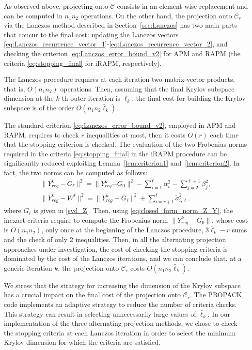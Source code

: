 \documentclass[pdflatex,sn-mathphys-num]{sn-jnl}
\numberwithin{equation}{section}%
\newcommand{\Yck}{{Y_{reg}^k}}
\newcommand{\setRank}{{\mathcal{C}_r}}
\newcommand{\setNorm}{{\mathcal{C} }}
\newcommand{\cZ}{G}
\newcommand{\REV}[1]{\textcolor{black}{#1}}
\newcommand{\ste}[1]{\textcolor{black}{#1}}
\theoremstyle{thmstyleone}%
\theoremstyle{thmstyletwo}%
\theoremstyle{thmstylethree}%
\begin{document}
As observed above, \REV{projecting} onto $\setNorm$ consists in an element-wise replacement and can be computed in $n_1n_2$ operations. On the other hand, the projection onto $\setRank$ via the Lanczos method described in Section~\ref{sec:Lanczos} has two main parts that concur to the final cost: updating the Lanczos vectors \eqref{eq:Lanczos_recurrence_vector_1}-\eqref{eq:Lanczos_recurrence_vector_2}, and checking the criterion \eqref{eq:Lanczos_error_bound_v2} for APM and RAPM (the criteria \eqref{eq:stopping_final} for iRAPM, respectively).

The Lanczos procedure requires at each iteration two matrix-vector products, that is, $O(n_1n_2)$ operations. Then, assuming that the final Krylov subspace dimension at the $k$-th outer iteration is $\bar \ell_k$, the final cost for building the Krylov subspace is of the order $O(n_1n_2\bar\ell_k)$.

The standard criterion  \eqref{eq:Lanczos_error_bound_v2}, employed in APM and RAPM, requires to check $r$ inequalities at most, then it costs $O(r)$ each time that the stopping criterion is checked. The evaluation of the  two Frobenius norms required in the criteria \eqref{eq:stopping_final} in the iRAPM procedure can be significantly reduced exploiting Lemma~\ref{lem:criterion1} and~\ref{lem:criterion2}. In fact, the two norms can be computed as follows:
\ste{
\begin{equation}
 \label{eq:closed_form_norm_Z_Y}
\begin{array}{l}
	\| \Yck - \cZ_\ell \| ^2 = \| \Yck {-\cZ_0}\| ^2 - \sum_{i = 1}^{\ell} \alpha_i^2 - \sum_{j = 2}^{\ell+1} \beta_j^2, \\  \| \Yck - W^\ell \| ^2 = \| \Yck-\cZ_\ell \| ^2 + \sum_{i=r+1}^\ell \tilde{\sigma}_{i,\ell}^2.
\end{array}
\end{equation}}
where $\cZ_\ell$ is given in \eqref{svd_Z}. Then, using \eqref{eq:closed_form_norm_Z_Y}, the inexact criteria require to compute the Frobenius norm $\| \Yck - \cZ_0\| $, whose cost is $O(n_1n_2)$, only once at the beginning of the Lanczos procedure, \REV{$3\bar\ell_k-r$ sums} and the check of only 2 inequalities. 
Then, in all the alternating projection approaches under investigation, the cost of checking the stopping criteria is dominated by the cost of the Lanczos iterations, and we can conclude that, at a generic iteration $k$, the projection onto $\setRank$ costs $O(n_1n_2\bar\ell_k)$.

We stress that the strategy for increasing the dimension of the Krylov subspace has a crucial impact on the final cost of the projection onto $\setRank$. {The PROPACK code implements an adaptive strategy to reduce the number of criteria checks.} This strategy can result in selecting unnecessarily large values of $\bar\ell_k$. In our implementation of the three alternating projection methods, we chose to check the stopping criteria at each Lanczos iteration {in order to select the minimum Krylov dimension for which the criteria are satisfied.}
\end{document}

